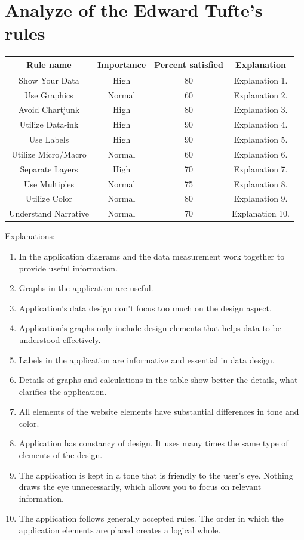 \documentclass[a4paper,12pt,oneside]{article}
\begin{document}
\newpage
\section{Analyze of the Edward Tufte's rules}

\begin{center}
 \begin{tabular}{||c c c c||} 
 \hline
 Rule name & Importance & Percent satisfied & Explanation \\ [0.5ex] 
 \hline\hline
 Show Your Data & High & 80 & Explanation 1. \\ 
 \hline
 Use Graphics & Normal & 60 &  Explanation 2. \\
 \hline
 Avoid Chartjunk & High & 80 &  Explanation 3. \\
 \hline
 Utilize Data-ink & High & 90 &  Explanation 4. \\
 \hline
 Use Labels & High & 90 &  Explanation 5. \\ 
 \hline
 Utilize Micro/Macro & Normal & 60 &  Explanation 6. \\ 
 \hline
 Separate Layers & High & 70 &  Explanation 7. \\ 
 \hline
 Use Multiples & Normal & 75 &  Explanation 8. \\ 
 \hline
 Utilize Color & Normal & 80 &  Explanation 9. \\ 
 \hline
 Understand Narrative & Normal & 70 &  Explanation 10. \\ 
 \hline
\end{tabular}
\end{center}

Explanations:
\begin{enumerate}
    \item In the application diagrams and the data measurement work together to provide useful information.
    \item Graphs in the application are useful. 
    \item Application's data design don't focus too much on the design aspect.
    \item Application's graphs only include design elements that helps data to be understood effectively.
    \item Labels in the application are informative and essential in data design.
    \item Details of graphs and calculations in the table show better the details, what clarifies the application.
    \item All elements of the website elements have substantial differences in tone and color.
    \item Application has constancy of design. It uses many times the same type of elements of the design.
    \item The application is kept in a tone that is friendly to the user's eye. Nothing draws the eye unnecessarily, which allows you to focus on relevant information.
    \item The application follows generally accepted rules. The order in which the application elements are placed creates a logical whole.
\end{enumerate}
\end{document}
